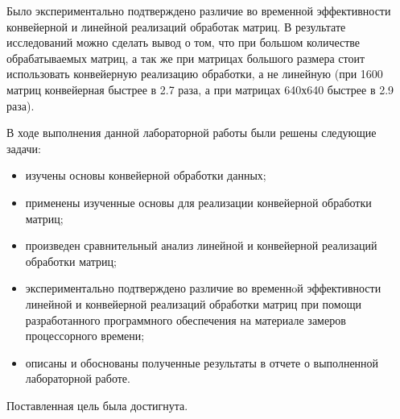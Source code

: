 \Conclusion %


Было экспериментально подтверждено различие во временной эффективности конвейерной и линейной реализаций обработак матриц. В результате исследований можно сделать вывод о том, что при большом количестве обрабатываемых матриц, а так же при матрицах большого размера стоит использовать конвейерную реализацию обработки, а не линейную (при 1600 матриц конвейерная быстрее в 2.7 раза, а при матрицах 640х640 быстрее в 2.9 раза).

В ходе выполнения данной лабораторной работы были решены следующие задачи:
\begin{itemize}
	\item изучены основы конвейерной обработки данных;
	\item применены изученные основы для реализации конвейерной обработки матриц;
	\item произведен сравнительный анализ линейной и конвейерной реализаций обработки матриц;
	\item экспериментально подтверждено различие во временнoй эффективности линейной и конвейерной реализаций обработки матриц при помощи разработанного программного обеспечения на материале замеров процессорного времени;
	\item описаны и обоснованы полученные результаты в отчете о выполненной лабораторной работе.
\end{itemize}

Поставленная цель была достигнута.



